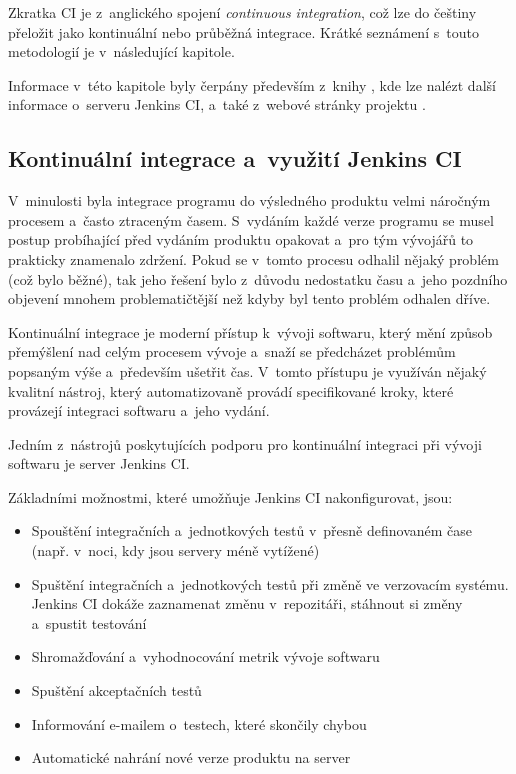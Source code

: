         Zkratka CI je z~anglického spojení \emph{continuous integration}, což lze do češtiny přeložit jako kontinuální nebo průběžná 
        integrace. Krátké seznámení s~touto metodologií je v~následující kapitole.

        Informace v~této kapitole byly čerpány především  z~knihy \cite{jenkinsBook}, kde lze nalézt další informace o~serveru Jenkins CI,
        a~také z~webové stránky projektu \cite{jenkinsWeb}.

        \subsection{Kontinuální integrace a~využití Jenkins CI}
            V~minulosti byla integrace programu do výsledného produktu velmi náročným procesem a~často ztraceným časem.
            S~vydáním každé verze programu se musel postup probíhající před vydáním produktu opakovat a~pro tým vývojářů
            to prakticky znamenalo zdržení. Pokud se v~tomto procesu odhalil nějaký problém (což bylo běžné),
            tak jeho řešení bylo z~důvodu nedostatku času a~jeho pozdního objevení mnohem problematičtější
            než kdyby byl tento problém odhalen dříve.

            Kontinuální integrace je moderní přístup k~vývoji softwaru, který mění způsob přemýšlení nad celým procesem vývoje
            a~snaží se předcházet problémům popsaným výše a~především ušetřit čas. V~tomto přístupu je využíván nějaký
            kvalitní nástroj, který automatizovaně provádí specifikované kroky, které provázejí integraci softwaru a~jeho vydání.

            Jedním z~nástrojů poskytujících podporu pro kontinuální integraci při vývoji softwaru je 
            server Jenkins CI. 
            
            \medskip \noindent Základními možnostmi, které umožňuje Jenkins CI nakonfigurovat, jsou:
            
            \begin{itemize}
                \item Spouštění integračních a~jednotkových testů v~přesně definovaném čase (např. v~noci, kdy jsou servery méně vytížené)
                \item Spuštění integračních a~jednotkových testů při změně ve verzovacím systému. Jenkins CI dokáže zaznamenat změnu v~repozitáři,
                    stáhnout si změny a~spustit testování
                \item Shromažďování a~vyhodnocování metrik vývoje softwaru
                \item Spuštění akceptačních testů
                \item Informování e-mailem o~testech, které skončily chybou
                \item Automatické nahrání nové verze produktu na server
            \end{itemize} 

